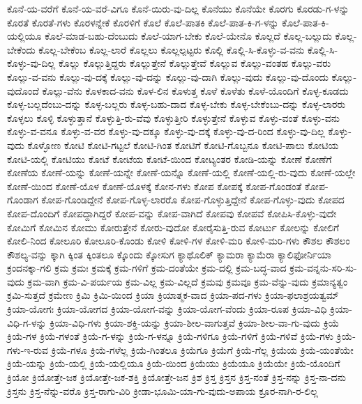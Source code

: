 {ಕೊನೆ-ಯ-ವರೆಗೆ
ಕೊನೆ-ಯ-ವರೆ-ವಿಗೂ
ಕೊನೆ-ಯಿರು-ವು-ದಿಲ್ಲ
ಕೊನೆಯು
ಕೊನೆಯೇ
ಕೊರಗು
ಕೊರಡು-ಗ-ಳನ್ನು
ಕೊರತೆ
ಕೊರತೆ-ಗಳು
ಕೊರಳನ್ನೇಕೆ
ಕೊರಳಿಗೆ
ಕೊಲೆ
ಕೊಲೆ-ಪಾತಕಿ
ಕೊಲೆ-ಪಾತ-ಕಿ-ಗ-ಳನ್ನು
ಕೊಲೆ-ಪಾತ-ಕಿ-ಯಲ್ಲಿಯೂ
ಕೊಲೆ-ಮಾಡ-ಬಹು-ದೆಂಬುದು
ಕೊಲೆ-ಯಾಗ-ಬೇಕು
ಕೊಲೆ-ಯೇನೊ
ಕೊಲ್ಲದೆ
ಕೊಲ್ಲ-ಬಲ್ಲುದು
ಕೊಲ್ಲ-ಬೇಕೆಂದು
ಕೊಲ್ಲ-ಬೇಕೆಂಬ
ಕೊಲ್ಲ-ಲಾರೆ
ಕೊಲ್ಲಲು
ಕೊಲ್ಲಲ್ಪಟ್ಟರು
ಕೊಲ್ಲಿ
ಕೊಲ್ಲಿ-ಸಿ-ಕೊಳ್ಳು-ವ-ವನು
ಕೊಲ್ಲಿ-ಸಿ-ಕೊಳ್ಳು-ವು-ದಿಲ್ಲ
ಕೊಲ್ಲು
ಕೊಲ್ಲುತ್ತಿದ್ದರು
ಕೊಲ್ಲುತ್ತೇನೆ
ಕೊಲ್ಲುತ್ತೇವೆ
ಕೊಲ್ಲುವ
ಕೊಲ್ಲು-ವಂತಹ
ಕೊಲ್ಲು-ವರು
ಕೊಲ್ಲು-ವ-ವನು
ಕೊಲ್ಲು-ವು-ದಕ್ಕೆ
ಕೊಲ್ಲು-ವು-ದನ್ನು
ಕೊಲ್ಲು-ವು-ದಾಗಿ
ಕೊಲ್ಲು-ವುದು
ಕೊಲ್ಲು-ವು-ದೊಂದು
ಕೊಲ್ಲು-ವುದೊಂದೆ
ಕೊಲ್ಲು-ವೆನು
ಕೊಳಕಾದ-ವನು
ಕೊಳ-ಲಿನ
ಕೊಳುತ್ತ
ಕೊಳೆ
ಕೊಳೆತು
ಕೊಳೆ-ಯೊಂದಿಗೆ
ಕೊಳ್ಳ-ಕೂಡದು
ಕೊಳ್ಳ-ಬಲ್ಲದೆಂಬು-ದನ್ನು
ಕೊಳ್ಳ-ಬಲ್ಲರು
ಕೊಳ್ಳ-ಬಹು-ದಾದ
ಕೊಳ್ಳ-ಬೇಕು
ಕೊಳ್ಳ-ಬೇಕೆಂಬು-ದನ್ನು
ಕೊಳ್ಳ-ಲಾರರು
ಕೊಳ್ಳಲು
ಕೊಳ್ಳಿ
ಕೊಳ್ಳುತ್ತಾನೆ
ಕೊಳ್ಳುತ್ತಿ-ರು-ವೆವು
ಕೊಳ್ಳುತ್ತೀರಿ
ಕೊಳ್ಳುತ್ತೇನೆ
ಕೊಳ್ಳುವ
ಕೊಳ್ಳು-ವಂತೆ
ಕೊಳ್ಳು-ವನು
ಕೊಳ್ಳು-ವ-ವನೂ
ಕೊಳ್ಳು-ವ-ವರ
ಕೊಳ್ಳು-ವು-ದಕ್ಕೂ
ಕೊಳ್ಳು-ವು-ದಕ್ಕೆ
ಕೊಳ್ಳು-ವು-ದ-ರಿಂದ
ಕೊಳ್ಳು-ವು-ದಿಲ್ಲ
ಕೊಳ್ಳು-ವುದು
ಕೊಳ್ಳೋಣ
ಕೋಟಿ
ಕೋಟಿ-ಗಟ್ಟಲೆ
ಕೋಟಿ-ಗಿಂತ
ಕೋಟಿಗೆ
ಕೋಟಿ-ಗೊಬ್ಬನೂ
ಕೋಟಿ-ಪಾಲು
ಕೋಟಿಯ
ಕೋಟಿ-ಯಲ್ಲಿ
ಕೋಟಿಯು
ಕೋಟೆ
ಕೋಟೆಯ
ಕೋಟೆ-ಯಿಂದ
ಕೋಟ್ಯಂತರ
ಕೋಡಿ-ಯನ್ನು
ಕೋಣೆ
ಕೋಣೆಗೆ
ಕೋಣೆಯ
ಕೋಣೆ-ಯನ್ನು
ಕೋಣೆ-ಯನ್ನೇ
ಕೋಣೆ-ಯನ್ನೊ
ಕೋಣೆ-ಯಲ್ಲಿ
ಕೋಣೆ-ಯಲ್ಲಿ-ರು-ವುದು
ಕೋಣೆ-ಯಲ್ಲೇ
ಕೋಣೆ-ಯಿಂದ
ಕೋಣೆ-ಯೊಳ
ಕೋಣೆ-ಯೊಳಕ್ಕೆ
ಕೋನ-ಗಳು
ಕೋಪ
ಕೋಪಕ್ಕೆ
ಕೋಪ-ಗೊಂಡಂತೆ
ಕೋಪ-ಗೊಂಡಾಗ
ಕೋಪ-ಗೊಂಡಿದ್ದೇನೆ
ಕೋಪ-ಗೊಳ್ಳ-ಲಾರರೊ
ಕೋಪ-ಗೊಳ್ಳುತ್ತಿದ್ದೇನೆ
ಕೋಪ-ಗೊಳ್ಳು-ವುದು
ಕೋಪದ
ಕೋಪ-ದೊಂದಿಗೆ
ಕೋಪದ್ದಾಗಿದ್ದರೆ
ಕೋಪ-ವನ್ನು
ಕೋಪ-ವಾಗಿದೆ
ಕೋಪವು
ಕೋಪವೆ
ಕೋಪಿಸಿ-ಕೊಳ್ಳು-ವುದೇ
ಕೋಮಿಗೆ
ಕೋಮಿನ
ಕೋಮು
ಕೋರುತ್ತೇನೆ
ಕೋರು-ವುದೋ
ಕೋರೈಸುತ್ತಿ-ರುವ
ಕೋರ್ಟು
ಕೋಲನ್ನು
ಕೋಲಿಗೆ
ಕೋಲಿ-ನಿಂದ
ಕೋಲೂರಿ
ಕೋಲೂರಿ-ಕೊಂಡು
ಕೋಳಿ
ಕೋಳಿ-ಗಳ
ಕೋಳಿ-ಮರಿ
ಕೋಳಿ-ಮರಿ-ಗಳು
ಕೌಶಲ
ಕೌಶಲಂ
ಕೌಶಲ್ಯ-ವನ್ನು
ಕ್ಕಾಗಿ
ಕ್ಕಿಂತ
ಕ್ಕಿಂತಲೂ
ಕ್ಕೊಂದು
ಕ್ಕೋಸುಗ
ಕ್ಯಾಥೊಲಿಕ್
ಕ್ಯಾಮರಾ
ಕ್ಯಾಮೆರಾ
ಕ್ಯಾಲಿಫೋರ್ನಿಯಾ
ಕ್ರಂದನಕ್ಕಾ-ಗಲಿ
ಕ್ರಮ
ಕ್ರಮಃ
ಕ್ರಮಕ್ಕೆ
ಕ್ರಮ-ಗಳಿಗೆ
ಕ್ರಮ-ದಂತೆಯೇ
ಕ್ರಮ-ದಲ್ಲಿ
ಕ್ರಮ-ಬದ್ಧ-ವಾದ
ಕ್ರಮ-ವನ್ನನು-ಸರಿ-ಸು-ವುದು
ಕ್ರಮ-ವಾಗಿ
ಕ್ರಮ-ವಿ-ಪರ್ಯಯ
ಕ್ರಮ-ವಿಲ್ಲ
ಕ್ರಮ-ವಿಲ್ಲದೆ
ಕ್ರಮವು
ಕ್ರಮವೂ
ಕ್ರಮ-ವೆನ್ನು-ವುದು
ಕ್ರಮಾನ್ಯತ್ವಂ
ಕ್ರಮಿ-ಸುತ್ತದೆ
ಕ್ರಮೇಣ
ಕ್ರಿಮಿ
ಕ್ರಿಮಿ-ಯಿಂದ
ಕ್ರಿಯಾ
ಕ್ರಿಯಾತ್ಮಕ-ವಾದ
ಕ್ರಿಯಾ-ಪದ-ಗಳು
ಕ್ರಿಯಾ-ಫಲಾಶ್ರಯತ್ವಮ್
ಕ್ರಿಯಾ-ಯೋಗಃ
ಕ್ರಿಯಾ-ಯೋಗದ
ಕ್ರಿಯಾ-ಯೋಗ-ವನ್ನು
ಕ್ರಿಯಾ-ಯೋಗ-ವೆಂದು
ಕ್ರಿಯಾ-ರೂಪ
ಕ್ರಿಯಾ-ವಿಧಿ
ಕ್ರಿಯಾ-ವಿಧಿ-ಗ-ಳನ್ನು
ಕ್ರಿಯಾ-ವಿಧಿ-ಗಳು
ಕ್ರಿಯಾ-ಶಕ್ತಿ-ಯನ್ನು
ಕ್ರಿಯಾ-ಶೀಲ-ವಾಗುತ್ತವೆ
ಕ್ರಿಯಾ-ಶೀಲ-ವಾ-ಗು-ವುದು
ಕ್ರಿಯೆ
ಕ್ರಿಯೆ-ಗಳ
ಕ್ರಿಯೆ-ಗಳಂತೆ
ಕ್ರಿಯೆ-ಗ-ಳನ್ನು
ಕ್ರಿಯೆ-ಗ-ಳನ್ನೂ
ಕ್ರಿಯೆ-ಗಳಿಗೂ
ಕ್ರಿಯೆ-ಗಳಿಗೆ
ಕ್ರಿಯೆ-ಗಳಿವೆ
ಕ್ರಿಯೆ-ಗಳು
ಕ್ರಿಯೆ-ಗಳು-ಇ-ರುವ
ಕ್ರಿಯೆ-ಗಳೂ
ಕ್ರಿಯೆ-ಗಳೆಲ್ಲ
ಕ್ರಿಯೆ-ಗಿಂತಲೂ
ಕ್ರಿಯೆಗೂ
ಕ್ರಿಯೆಗೆ
ಕ್ರಿಯೆ-ಗೆಲ್ಲ
ಕ್ರಿಯೆಯ
ಕ್ರಿಯೆ-ಯಂತೆಯೇ
ಕ್ರಿಯೆ-ಯನ್ನು
ಕ್ರಿಯೆ-ಯಲ್ಲಿ
ಕ್ರಿಯೆ-ಯಲ್ಲಿಯೂ
ಕ್ರಿಯೆ-ಯಿಂದ
ಕ್ರಿಯೆಯು
ಕ್ರಿಯೆಯೂ
ಕ್ರಿಯೆಯೇ
ಕ್ರಿಯೆ-ಯೊಂದಿಗೆ
ಕ್ರಿಯೋ
ಕ್ರಿಯೋತ್ತೇ-ಜಕ
ಕ್ರಿಯೋತ್ತೇ-ಜಕ-ಶಕ್ತಿ
ಕ್ರಿಯೋತ್ತೇ-ಜನ
ಕ್ರಿಶ
ಕ್ರಿಸ್ತ
ಕ್ರಿಸ್ತನ
ಕ್ರಿಸ್ತ-ನಂತೆ
ಕ್ರಿಸ್ತ-ನನ್ನು
ಕ್ರಿಸ್ತ-ನಾ-ದನು
ಕ್ರಿಸ್ತನು
ಕ್ರಿಸ್ತ-ನೆನ್ನು-ವರೊ
ಕ್ರಿಸ್ತ-ರಾಗು-ವಿರಿ
ಕ್ರೀಡಾ-ಭೂಮಿ-ಯಾ-ಗು-ವುದು-ಅಪಾಯ
ಕ್ರೂರ-ನಾಗಿ-ರ-ಲಿಲ್ಲ
}
